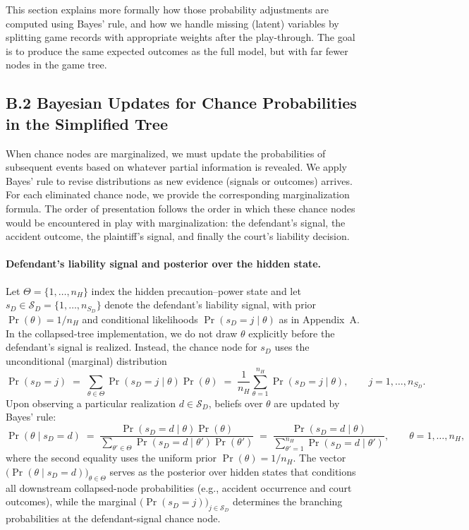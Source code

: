 \documentclass{article}
\begin{document}
This section explains more formally how those probability adjustments are computed using Bayes’ rule, and how we handle missing (latent) variables by splitting game records with appropriate weights after the play-through. The goal is to produce the same expected outcomes as the full model, but with far fewer nodes in the game tree.

\subsection*{B.2 Bayesian Updates for Chance Probabilities in the Simplified Tree}

When chance nodes are marginalized, we must update the probabilities of subsequent events based on whatever partial information is revealed. We apply Bayes’ rule to revise distributions as new evidence (signals or outcomes) arrives. For each eliminated chance node, we provide the corresponding marginalization formula. The order of presentation follows the order in which these chance nodes would be encountered in play with marginalization: the defendant’s signal, the accident outcome, the plaintiff’s signal, and finally the court’s liability decision.

\paragraph{Defendant’s liability signal and posterior over the hidden state.} 
Let $\Theta=\{1,\dots,n_H\}$ index the hidden precaution–power state and let $s_D\in\mathcal{S}_D=\{1,\dots,n_{S_D}\}$ denote the defendant’s liability signal, with prior $\Pr(\theta)=1/n_H$ and conditional likelihoods $\Pr(s_D=j\mid \theta)$ as in Appendix~A. In the collapsed-tree implementation, we do not draw $\theta$ explicitly before the defendant’s signal is realized. Instead, the chance node for $s_D$ uses the unconditional (marginal) distribution \[ \Pr(s_D=j) \;=\; \sum_{\theta\in\Theta}\Pr(s_D=j\mid \theta)\Pr(\theta) \;=\; \frac{1}{n_H}\sum_{\theta=1}^{n_H}\Pr(s_D=j\mid \theta), \qquad j=1,\dots,n_{S_D}. \] Upon observing a particular realization $d\in\mathcal{S}_D$, beliefs over $\theta$ are updated by Bayes’ rule: \[ \Pr(\theta\mid s_D=d) \;=\; \frac{\Pr(s_D=d\mid \theta)\Pr(\theta)}{\sum_{\theta'\in\Theta}\Pr(s_D=d\mid \theta')\Pr(\theta')} \;=\; \frac{\Pr(s_D=d\mid \theta)}{\sum_{\theta'=1}^{n_H}\Pr(s_D=d\mid \theta')}, \qquad \theta=1,\dots,n_H, \] where the second equality uses the uniform prior $\Pr(\theta)=1/n_H$. The vector $\bigl(\Pr(\theta\mid s_D=d)\bigr)_{\theta\in\Theta}$ serves as the posterior over hidden states that conditions all downstream collapsed-node probabilities (e.g., accident occurrence and court outcomes), while the marginal $\bigl(\Pr(s_D=j)\bigr)_{j\in\mathcal{S}_D}$ determines the branching probabilities at the defendant-signal chance node.
\end{document}
